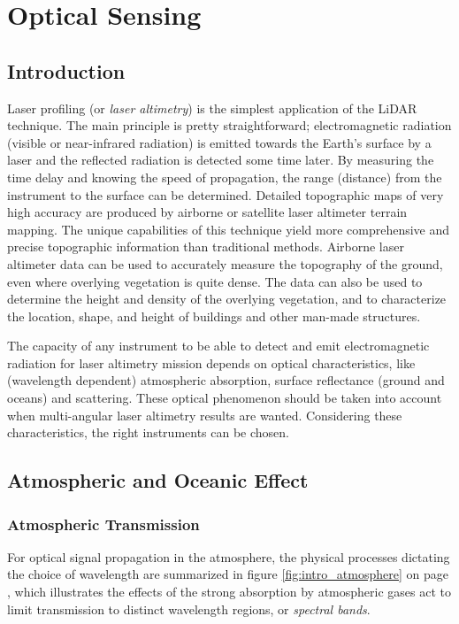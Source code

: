 \clearpage
\section{Optical Sensing}
\label{Optical_emitter_receiver}
\subsection{Introduction}
\label{op_intro}
Laser profiling (or \textit{laser altimetry}) is the simplest application of the \acs{LiDAR} technique. The main principle is pretty straightforward; electromagnetic radiation (visible or near-infrared radiation) is emitted towards the Earth's surface by a \acs{laser} and the reflected radiation is detected some time later. By measuring the time delay and knowing the speed of propagation, the range (distance) from the instrument to the surface can be determined. Detailed topographic maps of very high accuracy are produced by airborne or satellite laser altimeter terrain mapping. The unique capabilities of this technique yield more comprehensive and precise topographic information than traditional methods. Airborne laser altimeter data can be used to accurately measure the topography of the ground, even where overlying vegetation is quite dense. The data can also be used to determine the height and density of the overlying vegetation, and to characterize the location, shape, and height of buildings and other man-made structures.


The capacity of any instrument to be able to detect and emit electromagnetic radiation for \acs{laser} altimetry mission depends on optical characteristics, like (wavelength dependent) atmospheric absorption, surface reflectance (ground and oceans) and scattering. These optical phenomenon should be taken into account when multi-angular \acs{laser} altimetry results are wanted. Considering these characteristics, the right instruments can be chosen.

\subsection{Atmospheric and Oceanic Effect}
\label{introAandO}
\subsubsection{Atmospheric Transmission}
\label{introAtmospheric}
For optical signal propagation in the atmosphere, the physical processes dictating the choice of wavelength are summarized in figure \ref{fig:intro_atmosphere} on page \pageref{fig:intro_atmosphere}, which illustrates the effects of the strong absorption by atmospheric gases act to limit transmission to distinct wavelength regions, or \textit{spectral bands}.

